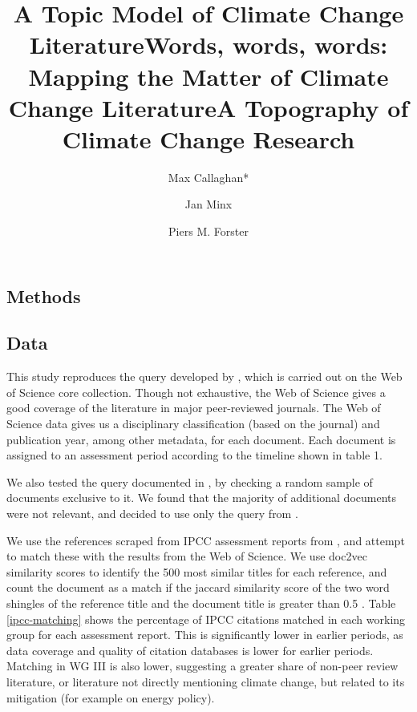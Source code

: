 \documentclass{article}
\makeatletter
\renewcommand{\maketitle}{\bgroup\setlength{\parindent}{0pt}
	\begin{flushleft}
		
		{\huge\textbf{\@title}}
		
		\bigskip
		
		{\large\textbf{\@author}}
		
		\bigskip
		
		{\large{ \@date}}
		
	\end{flushleft}\egroup
}
\makeatother
\begin{document}
	\title{A Topic Model of Climate Change Literature}
	\title{Words, words, words: Mapping the Matter of Climate Change Literature}
	\title{A Topography of Climate Change Research}
	
\author[1,2]{Max Callaghan*}
\author[1,2]{Jan Minx}
\author[2]{Piers M. Forster}

	\maketitle
	\begin{linenumbers}
		

		
		
		\section*{Methods}
		
					\setcounter{table}{0}
		\renewcommand\thetable{SI.\arabic{table}}  
		
		\subsection*{Data}
		
		This study reproduces the query developed by \citep{Grieneisen2011}, which is carried out on the Web of Science core collection. Though not exhaustive, the Web of Science gives a good coverage of the literature in major peer-reviewed journals. The Web of Science data gives us a disciplinary classification (based on the journal) and publication year, among other metadata, for each document.	Each document is assigned to an assessment period according to the timeline shown in table 1.
		
		We also tested the query documented in \cite{Haunschild2016}, by checking a random sample of documents exclusive to it. We found that the majority of additional documents were not relevant, and decided to use only the query from \cite{Grieneisen2011}.
		
		We use the references scraped from IPCC assessment reports from \citep{Minx2017l}, and attempt to match these with the results from the Web of Science. We use doc2vec similarity scores \cite{Le2014} to identify the 500 most similar titles for each reference, and count the document as a match if the jaccard similarity score of the two word shingles of the reference title and the document title is greater than 0.5 \cite{Khabsa2014}. Table \ref{ipcc-matching} shows the percentage of IPCC citations matched in each working group for each assessment report. This is significantly lower in earlier periods, as data coverage and quality of citation databases is lower for earlier periods. Matching in WG III is also lower, suggesting a greater share of non-peer review literature, or literature not directly mentioning climate change, but related to its mitigation (for example on energy policy).
		

\end{linenumbers}
\end{document}
